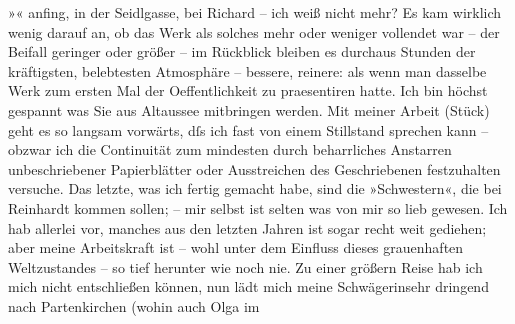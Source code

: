                   »\label{K_L02327-2v}\label{K_L02327-2}« anfing, in der Seidlgasse, bei Richard – ich weiß nicht mehr? Es kam wirklich wenig darauf an, ob das Werk
               als solches mehr oder weniger vollendet war – der Beifall geringer oder größer – im
               Rückblick bleiben es durchaus Stunden der kräftigsten, belebtesten Atmosphäre –
               bessere, reinere: als wenn man dasselbe Werk zum ersten Mal der Oeffentlich{\pb}keit zu praesentiren hatte. Ich bin höchst gespannt was
               Sie aus Altaussee mitbringen werden. Mit meiner
               Arbeit (Stück) geht es so
               langsam vorwärts, dſs ich fast von einem Stillstand sprechen kann – obzwar ich die
               Continuität zum mindesten durch beharrliches Anstarren unbeschriebener Papierblätter
               oder Ausstreichen des Geschriebenen festzuhalten versuche. Das letzte, was ich fertig
               gemacht \introOben{}habe\introOben{}, sind die »Schwestern«, die bei Reinhardt kommen
               sollen; – mir selbst ist selten was von mir so lieb gewesen. Ich hab allerlei vor,
               manches aus den letzten Jahren ist sogar recht weit gediehen; aber meine Arbeitskraft
               ist – wohl unter dem Einfluss dieses grauenhaften Weltzustandes – so tief herunter
               wie noch nie. Zu einer größern Reise hab ich mich nicht entschließen können, nun lädt
               mich meine Schwägerinsehr dringend nach Partenkirchen (wohin auch Olga im
